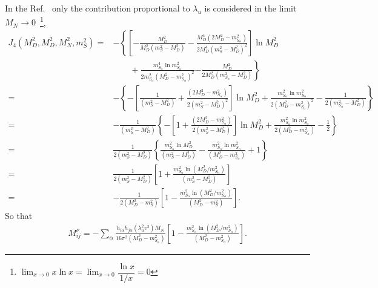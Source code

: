 %
In  the Ref.~\cite{Fraser:2014yha} only the contribution proportional to $\lambda_u$ is considered in the limit $M_N\to 0$~\footnote{$\lim_{x\to 0}x\ln x=\lim_{x\to 0}\dfrac{\ln x}{1/x}=0$}, 
\begin{align*}
   J_4\left(M_D^2,M_D^2,M_N^2,m^2_{S}  \right)=&
-\left\{  \left[-\frac{M_D^2}{M_D^2\left(m_{S}^2-M_D^2\right)} 
-\frac{M_D^4 \left(2M_D^2-m_{S_\alpha}^2\right)}{2M_D^4\left(m_{S}^2-M_D^2\right)^2} \right]\ln M_D^2\right.\nonumber\\
&\qquad+\frac{m_{S_\alpha}^4\ln m_{S_\alpha}^2}{2m_{S_\alpha}^2\left( M_D^2-m_{S_\alpha}^2 \right)^2} 
\left.-\frac{M_D^2}{2M_D^2\left(m_{S_\alpha}^2-M_D^2  \right)} \right\}\nonumber\\
=&  -\left\{  -\left[\frac{1}{\left(m_{S}^2-M_D^2\right)} 
+\frac{\left(2M_D^2-m_{S_\alpha}^2\right)}{2\left(m_{S}^2-M_D^2\right)^2} \right]\ln M_D^2
+\frac{m_{S_\alpha}^2\ln m_{S_\alpha}^2}{2\left( M_D^2-m_{S_\alpha}^2 \right)^2} 
-\frac{1}{2\left(m_{S_\alpha}^2-M_D^2  \right)} \right\}\nonumber\\
=&  -\frac{1}{\left(m_{S}^2-M_D^2\right)}\left\{  -\left[1 
+\frac{\left(2M_D^2-m_{S_\alpha}^2\right)}{2\left(m_{S}^2-M_D^2\right)} \right]\ln M_D^2
+\frac{m_{S_\alpha}^2\ln m_{S_\alpha}^2}{2\left( M_D^2-m_{S_\alpha}^2 \right)} 
-\frac{1}{2} \right\}\nonumber\\
= & \frac{1}{2\left(m_{S}^2-M_D^2\right)}\left\{  \frac{m_{S_\alpha}^2\ln M_D^2}{\left(m_{S}^2-M_D^2\right)}
-\frac{m_{S_\alpha}^2\ln m_{S_\alpha}^2}{\left( M_D^2-m_{S_\alpha}^2 \right)} +1 \right\}\nonumber\\
=&  \frac{1}{2\left(m_{S}^2-M_D^2\right)}\left[ 1+ \frac{m_{S_\alpha}^2\ln \left( M_D^2/m_{S_\alpha}^2 \right)}{\left(m_{S}^2-M_D^2\right)}
\right]\nonumber\\
=& - \frac{1}{2\left(M_D^2-m_{S}^2\right)}\left[ 1-\frac{m_{S_\alpha}^2\ln \left( M_D^2/m_{S_\alpha}^2 \right)}{\left(M_D^2-m_{S}^2\right)}
\right].
\end{align*}
So that
\begin{align*}
M^{\nu}_{ij}=-\sum_{\alpha}\frac{h_{i\alpha}h_{j\alpha}\left(\lambda_u^2 v^2\right)M_N}{16\pi^2\left(M_D^2-m_{S_\alpha}^2\right)}
\left[ 1-\frac{m_{S_\alpha}^2\ln \left( M_D^2/m_{S_\alpha}^2 \right)}{\left(M_D^2-m_{S_\alpha}^2\right)}\right].
\end{align*}









